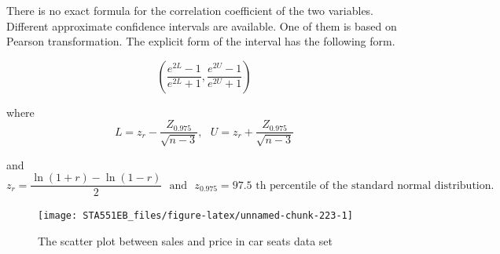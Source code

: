 \documentclass[
]{book}
\newenvironment{Shaded}{\begin{snugshade}}{\end{snugshade}}
\newcommand{\AttributeTok}[1]{\textcolor[rgb]{0.13,0.29,0.53}{#1}}
\newcommand{\DecValTok}[1]{\textcolor[rgb]{0.00,0.00,0.81}{#1}}
\newcommand{\FloatTok}[1]{\textcolor[rgb]{0.00,0.00,0.81}{#1}}
\newcommand{\FunctionTok}[1]{\textcolor[rgb]{0.13,0.29,0.53}{\textbf{#1}}}
\newcommand{\NormalTok}[1]{#1}
\newcommand{\OtherTok}[1]{\textcolor[rgb]{0.56,0.35,0.01}{#1}}
\newcommand{\SpecialCharTok}[1]{\textcolor[rgb]{0.81,0.36,0.00}{\textbf{#1}}}
\begin{document}
There is no exact formula for the correlation coefficient of the two variables. Different approximate confidence intervals are available. One of them is based on Pearson transformation. The explicit form of the interval has the following form.

\[
\left( \frac{e^{2L}-1}{e^{2L}+1},  \frac{e^{2U}-1}{e^{2U}+1}\right)
\]

where
\[
L = z_r - \frac{Z_{0.975}}{\sqrt{n-3}}, \ \ \ U = z_r + \frac{Z_{0.975}}{\sqrt{n-3}}
\]

and
\[
z_r = \frac{\ln(1+r)-\ln(1-r)}{2} \ \ \ \text{and} \ \ \ z_{0.975} = \text{97.5 th percentile of the standard normal distribution.}
\]

\begin{Shaded}
\end{Shaded}

\begin{figure}

{\centering \texttt{[image: STA551EB\_files/figure-latex/unnamed-chunk-223-1]} 

}

\caption{The scatter plot between sales and price in car seats data set}\label{fig:unnamed-chunk-223}
\end{figure}
\end{document}
